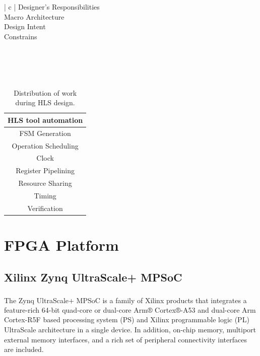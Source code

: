 \begin{table}[H]
    \center
    \begin{tabular}{ | c | }
        \hline
        Designer's Responsibilities\\
        \hline
        Macro Architecture\\
        Design Intent\\
        Constrains\\
        \hline
         \\
         \\
         \\
         \\
    \end{tabular}
    \quad
    \begin{tabular}{ | c | }
        \hline
        HLS tool automation\\
        \hline
        FSM Generation\\
        Operation Scheduling\\
        Clock\\
        Register Pipelining\\
        Resource Sharing\\
        Timing\\
        Verification\\
        \hline
    \end{tabular}
    \caption[HLS responsibilities]{Distribution of work during HLS design.}
    \label{HLS responsibilities}
\end{table}

\section{FPGA Platform}
\label{sec:fpga_platform}
\subsection{Xilinx Zynq UltraScale+ MPSoC}
The Zynq\textsuperscript{\textregistered} UltraScale+\texttrademark{} MPSoC is a family of Xilinx products that integrates a feature-rich 64-bit quad-core or dual-core Arm® Cortex®-A53 and dual-core Arm Cortex-R5F based processing system (PS) and Xilinx programmable logic (PL) UltraScale architecture in a single device. In addition, on-chip memory, multiport external memory interfaces, and a rich set of peripheral connectivity interfaces are included. \cite{Zynq_UltraScale_overview}

